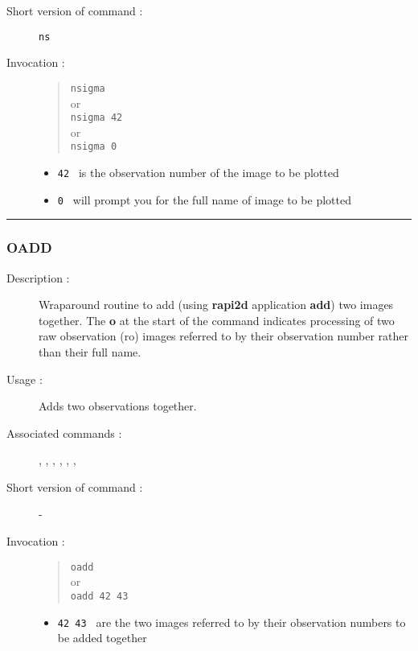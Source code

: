 \begin{description}
\item[Short version of command :] {\tt ns}
\item[Invocation :]

\begin{quote}{\tt  nsigma }\\
or \\
{\tt nsigma 42 }\\
or \\
{\tt nsigma 0 }
\end{quote}

\begin{itemize}
\item {\tt 42 } is the observation number of the image to be plotted
\item {\tt 0 } will prompt you for the full name of image to be plotted
\end{itemize}

\end{description}

\hrule
\subsubsection*{\label{OADD}OADD}

\begin{description}

\item[Description :] Wraparound routine to add (using {\bf rapi2d}
application {\bf add}) two images together.  The {\bf o} at the start of the
command indicates processing of two raw observation ({\sc ro}) images
referred to by their observation number rather than their full name.

\item[Usage :] Adds two observations together.

\item[Associated commands :] {\tt {}},
{\tt {}}, {\tt {}},
{\tt {}}, {\tt {}},
{\tt {}}, {\tt {}}

\item[Short version of command :] -
\item[Invocation :]

\begin{quote}{\tt  oadd }\\
or \\
{\tt oadd 42 43 }
\end{quote}

\begin{itemize}

\item {\tt 42 43 } are the two images referred to by their observation
 numbers to be added together
\end{itemize}

\end{description}

